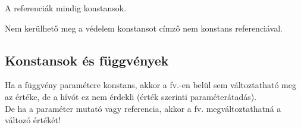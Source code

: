 \begin{frame}
    A referenciák mindig konstansok.
    \begin{exampleblock}{}
        \scriptsize
        
    \end{exampleblock}
    \vfill
    Nem kerülhető meg a védelem konstansot címző nem konstans referenciával.
    \begin{exampleblock}{}
        \tiny
        
    \end{exampleblock}
\end{frame}

\subsection{Konstansok és függvények}

\begin{frame}
    Ha a függvény paramétere konstans, akkor a fv.-en belül sem változtatható meg az értéke, de a hívót ez nem érdekli (érték szerinti paraméterátadás). \\
    De ha a paraméter mutató vagy referencia, akkor a fv. megváltoztathatná a változó értékét!
    \begin{exampleblock}{}
        \small
        
    \end{exampleblock}
\end{frame}

\begin{frame}
    \begin{exampleblock}{}
        \scriptsize
        
        
    \end{exampleblock}
\end{frame}


